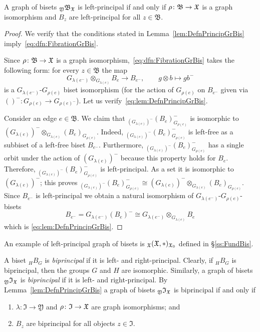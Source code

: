 \documentclass{amsart}
\begin{document}
\begin{lem}\label{lem:DefnPrincipGrBis}
  A graph of bisets ${}_{\mathfrak Y} \mathfrak B_{{\mathfrak X}}$ is
  left-principal if and only if $\rho \colon \mathfrak B\to{\mathfrak X} $ is a
  graph isomorphism and $B_z$ are left-principal for all
  $z\in \mathfrak B$.
\end{lem}
\begin{proof}
  We verify that the conditions stated in
  Lemma~\ref{lem:DefnPrincipGrBis}
  imply~\eqref{eq:dfn:FibrationGrBis}.

  Since $\rho \colon \mathfrak B\to{\mathfrak X} $ is a graph
  isomorphism,~\eqref{eq:dfn:FibrationGrBis} takes the following form:
  for every $z\in \mathfrak B$ the map
  \begin{equation}\label{eq:lem:DefnPrincipGrBis}
    G_{\lambda(e^-)} 
    \otimes_{G_{\lambda(e)}} B_e\rightarrow B_{e^-},\qquad g\otimes b\mapsto g b^-
  \end{equation} 
  is a $G_{\lambda(e^-)}$-$G_{\rho(e)}$ biset isomorphism (for the
  action of $G_{\rho(e)}$ on $B_{e^-}$ given via
  $()^-\colon G_{\rho(e)}\to G_{{\rho(e)}^-}$). Let us
  verify~\eqref{eq:lem:DefnPrincipGrBis}.

  Consider an edge $e\in \mathfrak B$. We claim that
  ${}_{(G_{\lambda(e)})^{-}}(B_e)^{-}_{G_{\rho(e)}}$ is isomorphic to
  $(G_{\lambda(e)})^{-}\otimes_{G_{\lambda(e)}}
  (B_e)_{G_{\rho(e)}}$. Indeed,
  ${}_{(G_{\lambda(e)})^{-}}(B_e)^{-}_{G_{\rho(e)}}$ is left-free as a
  subbiset of a left-free biset $B_{e^-}$. Furthermore,
  ${}_{(G_{\lambda(e)})^{-}}(B_e)^{-}_{G_{\rho(e)}}$ has a single
  orbit under the action of $(G_{\lambda(e)})^{-}$ because this
  property holds for $B_e$. Therefore,
  ${}_{(G_{\lambda(e)})^{-}}(B_e)^{-}_{G_{\rho(e)}}$ is
  left-principal. As a set it is isomorphic to $(G_{\lambda(e)})^{-}$;
  this proves
  ${}_{(G_{\lambda(e)})^{-}}(B_e)^{-}_{G_{\rho(e)}} \cong
  (G_{\lambda(e)})^{-}\otimes_{G_{\lambda(e)}}
  (B_e)_{G_{\rho(e)}}$. Since $B_{e^-}$ is left-principal we obtain a
  natural isomorphism of $G_{\lambda(e^-)}$-$G_{\rho(e)}$-bisets
  \[B_{e^-}= G_{\lambda(e^-)}(B_e)^{-} \cong
  G_{\lambda(e^-)}\otimes_{G_{\lambda(e)}} B_e \]
  which is \eqref{eq:lem:DefnPrincipGrBis}.
\end{proof}

An example of left-principal graph of bisets is 
${}_{{\mathfrak X}}({\mathfrak X},*)_{{\mathfrak X}_0}$ defined in \S\ref{ss:FundBis}.

A biset $_H B_G$ is \emph{biprincipal} if it is left- and
right-principal. Clearly, if $_H B_G$ is biprincipal, then the groups
$G$ and $H$ are isomorphic. Similarly, a graph of bisets
${}_{\mathfrak Y} \mathfrak I_{{\mathfrak X}}$ is \emph{biprincipal} if it is
left- and right-principal. By Lemma~\ref{lem:DefnPrincipGrBis} a graph
of bisets ${}_{\mathfrak Y} \mathfrak I_{{\mathfrak X}}$ is biprincipal if and
only if
\begin{enumerate}
\item $\lambda\colon \mathfrak I\to\mathfrak Y$ and $\rho\colon
  \mathfrak I\to{\mathfrak X}$ are graph isomorphisms; and
\item $B_z$ are biprincipal for all objects $z\in \mathfrak I$.\qedhere
\end{enumerate}
\end{document}
